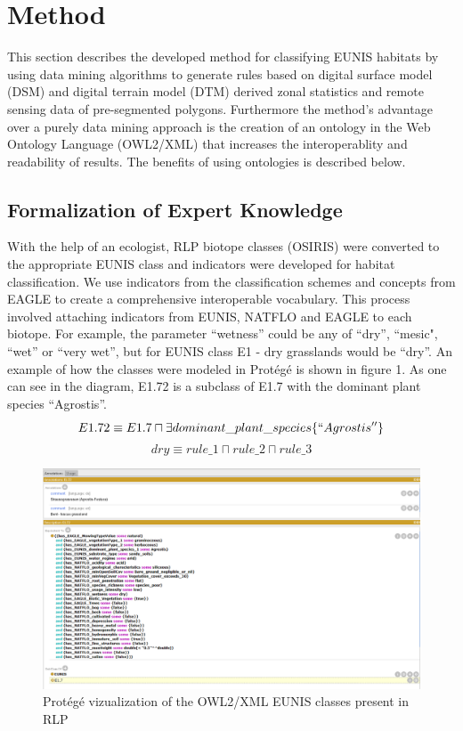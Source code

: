 \documentclass[authoryear, review,12pt,number]{elsarticle}
\begin{document}
\section{Method}
This section describes the developed method for classifying EUNIS habitats by
using data mining algorithms to generate rules based on digital surface
model (DSM) and digital terrain model (DTM) derived zonal statistics and remote
sensing data of pre-segmented polygons.
Furthermore the method's advantage over a purely data mining approach is
the creation of an ontology in the Web Ontology Language (OWL2/XML) that
increases the interoperablity and readability of results. The benefits of using
ontologies is described below.
\subsection{Formalization of Expert Knowledge}
With the help of an ecologist, RLP biotope classes (OSIRIS) were converted
to the appropriate EUNIS class and indicators were developed for habitat
classification. We use indicators from the classification schemes and concepts
from EAGLE to create a comprehensive interoperable vocabulary. This process
involved attaching indicators from EUNIS, NATFLO and EAGLE to each biotope.
For example, the parameter ``wetness'' could be any of ``dry'', ``mesic",
``wet'' or ``very wet'', but for EUNIS class E1 - dry grasslands would be
``dry''. An example of how the classes were  modeled in Prot\'eg\'e is shown in
figure 1. As one can see in the diagram, E1.72 is a subclass of E1.7 with the
dominant plant species ``Agrostis''.
$$ E1.72 \equiv  E1.7 \sqcap \exists dominant\_plant\_species
\{``Agrostis'' \}$$
$$
dry \equiv rule\_1 \sqcap rule\_2 \sqcap rule\_3
$$
\begin{figure}
	
\includegraphics[width=1\linewidth]{diagrams/protege_description_eunis.PNG}
	\caption{Prot\'eg\'e vizualization of the OWL2/XML EUNIS classes present in
	RLP}
\end{figure}
\end{document}
